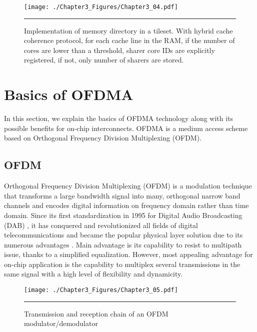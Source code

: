 \begin{figure}[htbp]
  \centering
    \texttt{[image: ./Chapter3\_Figures/Chapter3\_04.pdf]}
    \rule{35em}{0.5pt}
  \caption[Memory directory in a tileset]{Implementation of memory directory in a tileset. With hybrid cache coherence protocol, for each cache line in the RAM, if the number of cores are lower than a threshold, sharer core IDs are explicitly registered, if not, only number of sharers are stored.}
  \label{fig:Electron}
\end{figure}
   

\section{Basics of OFDMA}

In this section, we explain the basics of OFDMA technology along with its possible benefits for on-chip interconnects. OFDMA is a medium access scheme based on Orthogonal Frequency Division Multiplexing (OFDM).

\subsection{OFDM}

Orthogonal Frequency Division Multiplexing (OFDM) is a modulation technique that transforms a large bandwidth signal into many, orthogonal narrow band channels and encodes digital information on frequency domain rather than time domain. Since its first standardization in 1995 for Digital Audio Broadcasting (DAB) \cite{bruno1994digital}, it has conquered and revolutionized all fields of digital telecommunications and became the popular physical layer solution due to its numerous advantages \cite{zhouofdm}. Main advantage is its capability to resist to multipath issue, thanks to a simplified equalization. However, most appealing advantage for on-chip application is the capability to multiplex several transmissions in the same signal with a high level of flexibility and dynamicity.

\begin{figure}[htbp]
  \centering
    \texttt{[image: ./Chapter3\_Figures/Chapter3\_05.pdf]}
    \rule{35em}{0.5pt}
  \caption[Transmission and reception chain of an OFDM modulator/demodulator]{Transmission and reception chain of an OFDM modulator/demodulator}
  \label{fig:Electron}
\end{figure}


